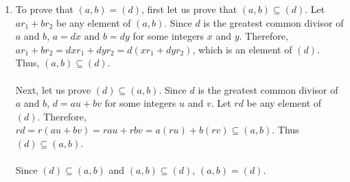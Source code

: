 \documentclass{article}
\begin{document}
\begin{enumerate}
\item To prove that $(a,b) = (d)$, first let us prove that $(a,b) \subseteq (d)$.
Let $ar_1 + br_2$ be any element of $(a,b)$.  Since $d$ is the greatest common
divisor of $a$ and $b$, $a = dx$ and $b = dy$ for some integers $x$ and $y$.
Therefore, $ar_1 + br_2 = dxr_1 + dyr_2 = d(xr_{1} + dyr_{2})$, which is an
element of $(d)$.  Thus, $(a,b) \subseteq (d)$. \\ \\
Next, let us prove $(d) \subseteq (a,b)$.  Since $d$ is the greatest common
divisor of $a$ and $b$, $d = au + bv$ for some integers $u$ and $v$.  Let
$rd$ be any element of $(d)$.
Therefore, $rd = r(au + bv) = rau + rbv = a(ru) + b(rv) \subseteq (a,b)$.
Thus $(d) \subseteq (a,b)$. \\ \\
Since $(d) \subseteq (a,b)$ and $(a,b) \subseteq (d)$, $(a,b) = (d)$.

\end{enumerate}
\end{document}
